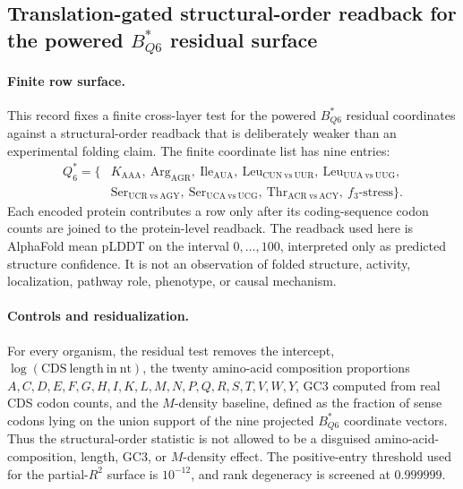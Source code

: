 \subsection{Translation-gated structural-order readback for the powered $B^{\ast}_{Q6}$ residual surface}
\label{subsec:bior-reality-q6-translation-gated-structural-order}

\paragraph{Finite row surface.}
This record fixes a finite cross-layer test for the powered $B^{\ast}_{Q6}$ residual coordinates against a structural-order readback that is deliberately weaker than an experimental folding claim. The finite coordinate list has nine entries:
$$
\begin{aligned}
Q_{6}^{\ast} = \{&K_{\mathrm{AAA}},\ \mathrm{Arg}_{\mathrm{AGR}},\ \mathrm{Ile}_{\mathrm{AUA}},\ \mathrm{Leu}_{\mathrm{CUN\ vs\ UUR}},\ \mathrm{Leu}_{\mathrm{UUA\ vs\ UUG}},\\
&\mathrm{Ser}_{\mathrm{UCR\ vs\ AGY}},\ \mathrm{Ser}_{\mathrm{UCA\ vs\ UCG}},\ \mathrm{Thr}_{\mathrm{ACR\ vs\ ACY}},\ f_{3}\text{-stress}\}.
\end{aligned}
$$
Each encoded protein contributes a row only after its coding-sequence codon counts are joined to the protein-level readback. The readback used here is AlphaFold mean pLDDT on the interval $0,\ldots,100$, interpreted only as predicted structure confidence. It is not an observation of folded structure, activity, localization, pathway role, phenotype, or causal mechanism.

\paragraph{Controls and residualization.}
For every organism, the residual test removes the intercept, $\log(\mathrm{CDS\ length\ in\ nt})$, the twenty amino-acid composition proportions $A,C,D,E,F,G,H,I,K,L,M,N,P,Q,R,S,T,V,W,Y$, GC3 computed from real CDS codon counts, and the $M$-density baseline, defined as the fraction of sense codons lying on the union support of the nine projected $B^{\ast}_{Q6}$ coordinate vectors. Thus the structural-order statistic is not allowed to be a disguised amino-acid-composition, length, GC3, or $M$-density effect. The positive-entry threshold used for the partial-$R^{2}$ surface is $10^{-12}$, and rank degeneracy is screened at $0.999999$.

